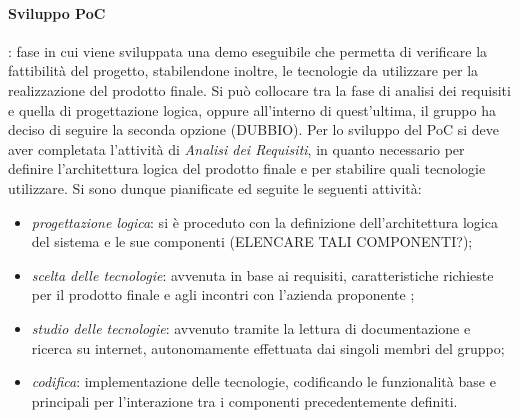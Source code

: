 \paragraph{Sviluppo PoC}: fase in cui viene sviluppata una demo eseguibile che permetta di verificare la fattibilità del progetto, stabilendone inoltre, le tecnologie da utilizzare per la realizzazione del prodotto finale. \newline
Si può collocare tra la fase di analisi dei requisiti e quella di progettazione logica, oppure all'interno di quest'ultima, il gruppo ha deciso di seguire la seconda opzione (DUBBIO). \newline %
Per lo sviluppo del PoC si deve aver completata l'attività di \textit{Analisi dei Requisiti}, in quanto necessario per definire l'architettura logica del prodotto finale e per stabilire quali tecnologie utilizzare. \newline
Si sono dunque pianificate ed seguite le seguenti attività:
\begin{itemize}
    \item \textit{progettazione logica}: si è proceduto con la definizione dell'architettura logica del sistema e le sue componenti (ELENCARE TALI COMPONENTI?);
    \item \textit{scelta delle tecnologie}: avvenuta in base ai requisiti, caratteristiche richieste per il prodotto finale e agli incontri con l'azienda proponente \companyName;
    \item \textit{studio delle tecnologie}: avvenuto tramite la lettura di documentazione e ricerca su internet, autonomamente effettuata dai singoli membri del gruppo;
    \item \textit{codifica}: implementazione delle tecnologie, codificando le funzionalità base e principali per l'interazione tra i componenti precedentemente definiti.
\end{itemize}

